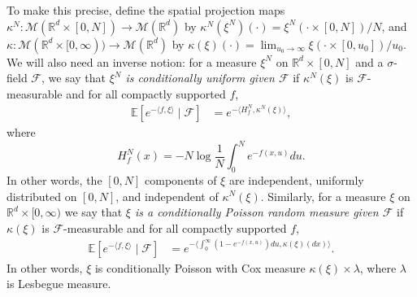 \documentclass[EJP]{ejpecp} %
\newcommand{\IE}{\mathbb E}
\newcommand{\IR}{\mathbb R}
\newcommand{\lp}{\xi}              %
\begin{document}
To make this precise,
define the spatial projection maps
$\kappa^N: \mathcal{M}(\IR^d \times [0, N]) \to \mathcal{M}(\IR^d)$
by $\kappa^N(\xi^N)(\cdot) = \xi^N(\cdot \times [0, N]) / N$,
and $\kappa: \mathcal{M}(\IR^d \times [0, \infty)) \to \mathcal{M}(\IR^d)$
by $\kappa(\xi)(\cdot) = \lim_{u_0 \to \infty} \xi(\cdot \times [0, u_0]) / u_0$.
We will also need an inverse notion:
for a measure $\lp^N$ on $\IR^d \times [0, N]$ and a $\sigma$-field $\mathcal{F}$,
we say that \emph{$\lp^N$ is conditionally uniform given $\mathcal{F}$}
if $\kappa^N(\lp)$ is $\mathcal{F}$-measurable and 
for all compactly supported $f$,
\begin{align} \label{eqn:conditionally_uniform}
    \IE[ e^{-\langle f, \lp \rangle} \;|\; \mathcal{F} ]
    &=
    e^{-\langle H_f^N, \kappa^N(\lp) \rangle} ,
\end{align}
where
$$ H_f^N(x) = - N \log \frac{1}{N} \int_0^N e^{-f(x, u)} du . $$
In other words, the $[0, N]$ components of $\lp$
are independent, uniformly distributed on $[0, N]$, and independent of 
$\kappa^N(\lp)$.
Similarly, for a measure $\lp$ on $\IR^d \times [0, \infty)$
we say that \emph{$\lp$ is a conditionally Poisson random measure given $\mathcal{F}$}
if $\kappa(\lp)$ is $\mathcal{F}$-measurable and 
for all compactly supported $f$,
\begin{align} \label{eqn:conditionally_poisson}
    \IE[ e^{-\langle f, \lp \rangle} \;|\; \mathcal{F} ]
    &=
    e^{-\langle \int_0^\infty (1 - e^{-f(x, u)}) du, \kappa(\lp)(dx) \rangle} .
\end{align}
In other words, $\lp$ is conditionally Poisson with Cox measure $\kappa(\lp) \times \lambda$,
where $\lambda$ is Lesbegue measure.
\end{document}
